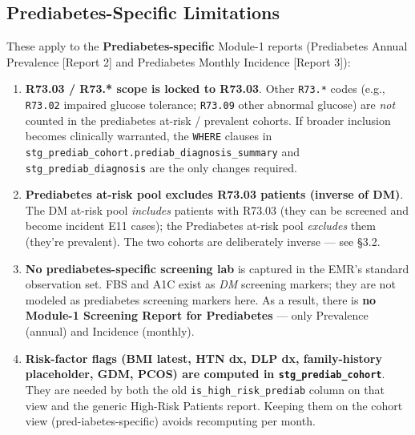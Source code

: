 \documentclass[11pt,a4paper]{article}
\begin{document}
\subsection{Prediabetes-Specific Limitations}
These apply to the \textbf{Prediabetes-specific} Module-1 reports (Prediabetes Annual Prevalence [Report 2] and Prediabetes Monthly Incidence [Report 3]):
\begin{enumerate}[leftmargin=*]
    \item \textbf{R73.03 / R73.* scope is locked to R73.03}. Other \texttt{R73.*} codes (e.g., \texttt{R73.02} impaired glucose tolerance; \texttt{R73.09} other abnormal glucose) are \emph{not} counted in the prediabetes at-risk / prevalent cohorts. If broader inclusion becomes clinically warranted, the \texttt{WHERE} clauses in \texttt{stg\_prediab\_cohort.prediab\_diagnosis\_summary} and \texttt{stg\_prediab\_diagnosis} are the only changes required.
    \item \textbf{Prediabetes at-risk pool excludes R73.03 patients (inverse of DM)}. The DM at-risk pool \emph{includes} patients with R73.03 (they can be screened and become incident E11 cases); the Prediabetes at-risk pool \emph{excludes} them (they're prevalent). The two cohorts are deliberately inverse --- see §3.2.
    \item \textbf{No prediabetes-specific screening lab} is captured in the EMR's standard observation set. FBS and A1C exist as \emph{DM} screening markers; they are not modeled as prediabetes screening markers here. As a result, there is \textbf{no Module-1 Screening Report for Prediabetes} --- only Prevalence (annual) and Incidence (monthly).
    \item \textbf{Risk-factor flags (BMI latest, HTN dx, DLP dx, family-history placeholder, GDM, PCOS) are computed in \texttt{stg\_prediab\_cohort}}. They are needed by both the old \texttt{is\_high\_risk\_prediab} column on that view and the generic High-Risk Patients report. Keeping them on the cohort view (pred-iabetes-specific) avoids recomputing per month.
\end{enumerate}
\end{document}
